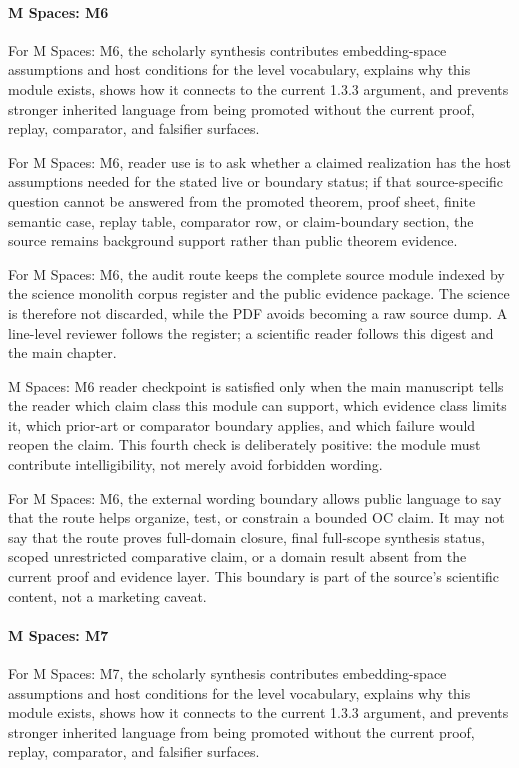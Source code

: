 \paragraph{M Spaces: M6}

For M Spaces: M6, the scholarly synthesis contributes embedding-space assumptions and host conditions for the level vocabulary, explains why this module exists, shows how it connects to the current 1.3.3 argument, and prevents stronger inherited language from being promoted without the current proof, replay, comparator, and falsifier surfaces.


For M Spaces: M6, reader use is to ask whether a claimed realization has the host assumptions needed for the stated live or boundary status; if that source-specific question cannot be answered from the promoted theorem, proof sheet, finite semantic case, replay table, comparator row, or claim-boundary section, the source remains background support rather than public theorem evidence.


For M Spaces: M6, the audit route keeps the complete source module indexed by the science monolith corpus register and the public evidence package. The science is therefore not discarded, while the PDF avoids becoming a raw source dump. A line-level reviewer follows the register; a scientific reader follows this digest and the main chapter.


M Spaces: M6 reader checkpoint is satisfied only when the main manuscript tells the reader which claim class this module can support, which evidence class limits it, which prior-art or comparator boundary applies, and which failure would reopen the claim. This fourth check is deliberately positive: the module must contribute intelligibility, not merely avoid forbidden wording.


For M Spaces: M6, the external wording boundary allows public language to say that the route helps organize, test, or constrain a bounded OC claim. It may not say that the route proves full-domain closure, final full-scope synthesis status, scoped unrestricted comparative claim, or a domain result absent from the current proof and evidence layer. This boundary is part of the source's scientific content, not a marketing caveat.


\paragraph{M Spaces: M7}

For M Spaces: M7, the scholarly synthesis contributes embedding-space assumptions and host conditions for the level vocabulary, explains why this module exists, shows how it connects to the current 1.3.3 argument, and prevents stronger inherited language from being promoted without the current proof, replay, comparator, and falsifier surfaces.


